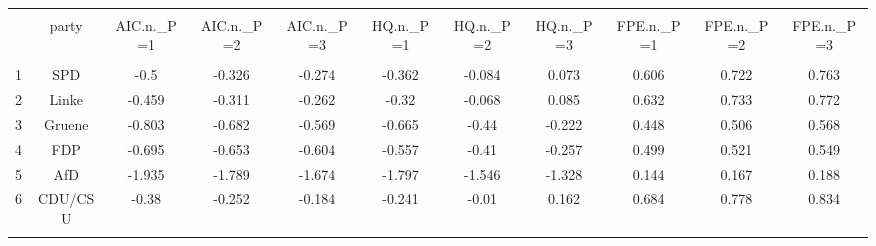 
\begin{table}[!htbp] \centering 
  \caption{} 
  \label{} 
\begin{tabular}{@{\extracolsep{5pt}} ccccccccccc} 
\\[-1.8ex]\hline 
\hline \\[-1.8ex] 
 & party & AIC.n.\_P=1 & AIC.n.\_P=2 & AIC.n.\_P=3 & HQ.n.\_P=1 & HQ.n.\_P=2 & HQ.n.\_P=3 & FPE.n.\_P=1 & FPE.n.\_P=2 & FPE.n.\_P=3 \\ 
\hline \\[-1.8ex] 
1 & SPD & -0.5 & -0.326 & -0.274 & -0.362 & -0.084 & 0.073 & 0.606 & 0.722 & 0.763 \\ 
2 & Linke & -0.459 & -0.311 & -0.262 & -0.32 & -0.068 & 0.085 & 0.632 & 0.733 & 0.772 \\ 
3 & Gruene & -0.803 & -0.682 & -0.569 & -0.665 & -0.44 & -0.222 & 0.448 & 0.506 & 0.568 \\ 
4 & FDP & -0.695 & -0.653 & -0.604 & -0.557 & -0.41 & -0.257 & 0.499 & 0.521 & 0.549 \\ 
5 & AfD & -1.935 & -1.789 & -1.674 & -1.797 & -1.546 & -1.328 & 0.144 & 0.167 & 0.188 \\ 
6 & CDU/CSU & -0.38 & -0.252 & -0.184 & -0.241 & -0.01 & 0.162 & 0.684 & 0.778 & 0.834 \\ 
\hline \\[-1.8ex] 
\end{tabular} 
\end{table}  
